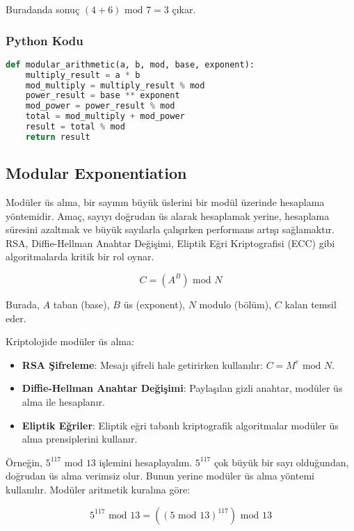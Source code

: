 Buradanda sonuç $(4 + 6) \text{ mod } 7 = 3$ çıkar.

\subsubsection{Python Kodu}

\begin{lstlisting}[language=Python]
def modular_arithmetic(a, b, mod, base, exponent):
    multiply_result = a * b
    mod_multiply = multiply_result % mod
    power_result = base ** exponent
    mod_power = power_result % mod
    total = mod_multiply + mod_power
    result = total % mod
    return result
\end{lstlisting}

\newpage

\subsection{Modular Exponentiation}

Modüler üs alma, bir sayının büyük üslerini bir modül üzerinde hesaplama yöntemidir. Amaç, sayıyı doğrudan üs alarak hesaplamak yerine, hesaplama süresini azaltmak ve büyük sayılarla çalışırken performans artışı sağlamaktır. RSA, Diffie-Hellman Anahtar Değişimi, Eliptik Eğri Kriptografisi (ECC) gibi algoritmalarda kritik bir rol oynar.

\[ C = (A^B) \text{ mod } N \]

Burada, $A$ taban (base), $B$ üs (exponent), $N$ modulo (bölüm), $C$ kalan temsil eder.

Kriptolojide modüler üs alma:

\begin{itemize}
    \item \textbf{RSA Şifreleme}: Mesajı şifreli hale getirirken kullanılır: $C = M^e \text{ mod } N$.
    \item \textbf{Diffie-Hellman Anahtar Değişimi}: Paylaşılan gizli anahtar, modüler üs alma ile hesaplanır.
    \item \textbf{Eliptik Eğriler}: Eliptik eğri tabanlı kriptografik algoritmalar modüler üs alma prensiplerini kullanır.
\end{itemize}

Örneğin, $5^{117} \text{ mod } 13$ işlemini hesaplayalım. $5^{117}$ çok büyük bir sayı olduğundan, doğrudan üs alma verimsiz olur. Bunun yerine modüler üs alma yöntemi kullanılır. Modüler aritmetik kuralına göre:

\[ 5^{117} \text{ mod } 13 = ((5 \text{ mod } 13)^{117}) \text{ mod } 13 \]

